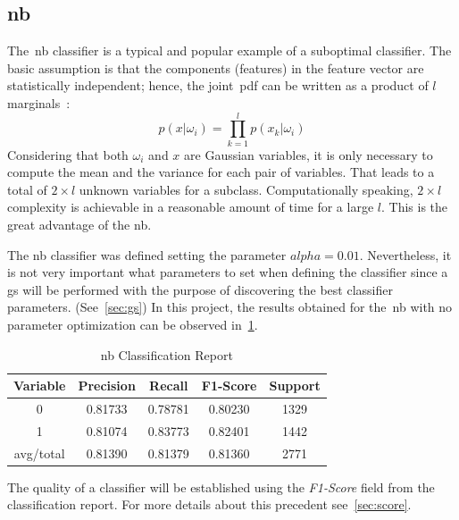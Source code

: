 \subsection{\acf{nb}}
The~\ac{nb} classifier is a typical and popular example of a suboptimal classifier. The basic assumption is that the components (features) in the feature vector are statistically independent; hence, the joint~\ac{pdf} can be written as a product of $l$ marginals~\cite{classif}:
\begin{equation}
p(x|\omega_i)=\prod_{k=1}^{l}p(x_k|\omega_i)
\label{ec:nb}
\end{equation}
Considering that both $\omega_i$ and $x$ are Gaussian variables, it is only necessary to compute the mean and the variance for each pair of variables. That leads to a total of $2\times l$ unknown variables for a subclass. Computationally speaking, $2\times l$ complexity is achievable in a reasonable amount of time for a large $l$. This is the great advantage of the \ac{nb}.\par
The \ac{nb} classifier was defined setting the parameter $alpha = 0.01$. Nevertheless, it is not very important what parameters to set when defining the classifier since a \ac{gs} will be performed with the purpose of discovering the best classifier parameters. (See~\cref{sec:gs})
In this project, the results obtained for the~\ac{nb} with no parameter optimization can be observed in~\cref{tab:nb1}.
\begin{table}[h!]
	\centering
	\begin{tabular}{||c c c c c||} 
		\hline
		Variable & Precision & Recall & F1-Score & Support \\ [0.5ex] 
		\hline\hline
		0 & 0.81733 & 0.78781 & 0.80230 & 1329 \\ 
		1 & 0.81074 & 0.83773 & 0.82401 & 1442 \\
		avg/total & 0.81390 & 0.81379 & 0.81360 & 2771 \\
		[1ex] 
		\hline
	\end{tabular}
	\caption{\acl{nb} Classification Report}
	\label{tab:nb1}
\end{table}
The quality of a classifier will be established using the \textit{F1-Score} field from the classification report. For more details about this precedent see~\cref{sec:score}.
